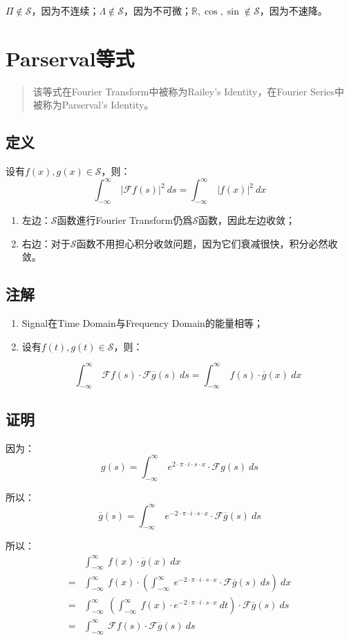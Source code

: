 $\Pi\notin \mathcal  {S}$，因为不连续；$\Lambda\notin \mathcal  {S}$，因为不可微；$\mathbb{R},\cos,\sin \notin \mathcal  {S}$，因为不速降。

\section{Parserval等式}
\begin{quote}
	该等式在Fourier Transform中被称为Railey's Identity，在Fourier Series中被称为Parserval's Identity。
\end{quote}
\subsection{定义}
设有$f(x),g(x)\in \mathcal  {S}$，则：
\begin{equation}
	\int_{-\infty}^{\infty}\ |\mathcal{F}f(s)|^2\ ds=\int_{-\infty}^{\infty}\ |f(x)|^2\ dx
\end{equation}
\begin{enumerate}
	\item 左边：$\mathcal  {S}$函数進行Fourier Transform仍爲$\mathcal  {S}$函数，因此左边收敛；
	\item 右边：对于$\mathcal  {S}$函数不用担心积分收敛问题，因为它们衰减很快，积分必然收敛。
\end{enumerate}
\subsection{注解}
\begin{enumerate}
	\def\labelenumi{\arabic{enumi}.}
	\item
	      Signal在Time Domain与Frequency Domain的能量相等；
	\item
	      设有$f(t),g(t)\in \mathcal  {S}$，则：

	      $$
		      \int_{-\infty}^{\infty}\ \mathcal{F}f(s)\cdot \mathcal{F}\overline{g}(s)\ ds=\int_{-\infty}^{\infty}\ f(s)\cdot \overline{g}(x)\ dx
	      $$
\end{enumerate}
\subsection{证明}
因为：
$$
	g(s)=\int_{-\infty}^{\infty}\ e^{2\cdot \pi\cdot i\cdot s\cdot x}\cdot \mathcal{F}g(s)\ ds
$$

所以：
$$
	\overline{g}(s)=\int_{-\infty}^{\infty}\ e^{-2\cdot \pi\cdot i\cdot s\cdot x}\cdot \mathcal{F}\overline{g}(s)\ ds
$$

所以：
\begin{align*}
	  & \int_{-\infty}^{\infty}\ f(x)\cdot \overline{g}(x)\ dx                                                                                     \\
	= & \int_{-\infty}^{\infty}\ f(x)\cdot(\int_{-\infty}^{\infty}\ e^{-2\cdot \pi\cdot i\cdot s\cdot x}\cdot \mathcal{F}\overline{g}(s)\ ds)\ dx  \\
	= & \int_{-\infty}^{\infty}\ (\int_{-\infty}^{\infty}\ f(x)\cdot e^{-2\cdot \pi\cdot i\cdot s\cdot x}\ dt)\cdot \mathcal{F}\overline{g}(s)\ ds \\
	= & \int_{-\infty}^{\infty}\ \mathcal{F}f(s)\cdot\mathcal{F}\overline{g}(s)\ ds
\end{align*}

